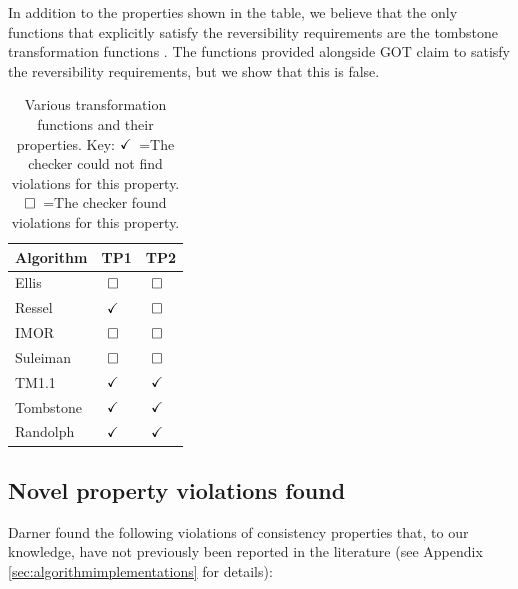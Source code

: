\documentclass[sigplan,10pt,review,anonymous]{acmart}
\newcommand{\noviol}{\ensuremath{\checkmark\hphantom{{}^{*}}}}
\newcommand{\knownviol}{\ensuremath{\square\hphantom{{}^{*}}}}
\begin{document}
In addition to the properties shown in the table, we believe that the only functions that explicitly satisfy the reversibility requirements are the tombstone transformation functions \cite{Oster2006TTF}. The functions provided alongside GOT claim to satisfy the reversibility requirements, but we show that this is false.

\begin{table}
  \caption{Various transformation functions and their properties. Key: \noviol=The checker could not find violations for this property. \knownviol=The checker
    found violations for this property.}
  \label{tab:tfproperties}
    \begin{tabular}{lcc}
        \toprule
        Algorithm & TP1 & TP2 \\
        \midrule
        Ellis \cite{Ellis1989} & \knownviol & \knownviol \\
        Ressel \cite{Ressel1996}  & \noviol & \knownviol \\
        IMOR  \cite{Imine2003} & \knownviol & \knownviol \\
        Suleiman \cite{Suleiman1997} & \knownviol & \knownviol \\
        TM1.1 \cite{Sun2017} & \noviol & \noviol   \\
        Tombstone \cite{Oster2006TTF}  & \noviol & \noviol \\
        Randolph \cite{Randolph2015} & \noviol & \noviol \\
        \bottomrule
    \end{tabular}   
\end{table}

\subsection{Novel property violations found}

Darner found the following violations of consistency properties that, to our knowledge, have not previously been reported in the literature (see Appendix \ref{sec:algorithmimplementations} for details):
\end{document}
